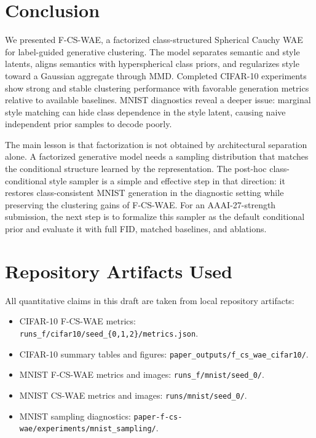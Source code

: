 \documentclass[10pt]{article}
\newcommand{\ours}{F-CS-WAE}
\newcommand{\simple}{CS-WAE}
\begin{document}
\section{Conclusion}

We presented \ours, a factorized class-structured Spherical Cauchy WAE for label-guided generative clustering. The model separates semantic and style latents, aligns semantics with hyperspherical class priors, and regularizes style toward a Gaussian aggregate through MMD. Completed CIFAR-10 experiments show strong and stable clustering performance with favorable generation metrics relative to available baselines. MNIST diagnostics reveal a deeper issue: marginal style matching can hide class dependence in the style latent, causing naive independent prior samples to decode poorly.

The main lesson is that factorization is not obtained by architectural separation alone. A factorized generative model needs a sampling distribution that matches the conditional structure learned by the representation. The post-hoc class-conditional style sampler is a simple and effective step in that direction: it restores class-consistent MNIST generation in the diagnostic setting while preserving the clustering gains of \ours{}. For an AAAI-27-strength submission, the next step is to formalize this sampler as the default conditional prior and evaluate it with full FID, matched baselines, and ablations.




\appendix

\section{Repository Artifacts Used}

All quantitative claims in this draft are taken from local repository artifacts:
\begin{itemize}
    \item CIFAR-10 \ours{} metrics: \texttt{runs\_f/cifar10/seed\_\{0,1,2\}/metrics.json}.
    \item CIFAR-10 summary tables and figures: \texttt{paper\_outputs/f\_cs\_wae\_cifar10/}.
    \item MNIST \ours{} metrics and images: \texttt{runs\_f/mnist/seed\_0/}.
    \item MNIST \simple{} metrics and images: \texttt{runs/mnist/seed\_0/}.
    \item MNIST sampling diagnostics: \texttt{paper-f-cs-wae/experiments/mnist\_sampling/}.
\end{itemize}
\end{document}
